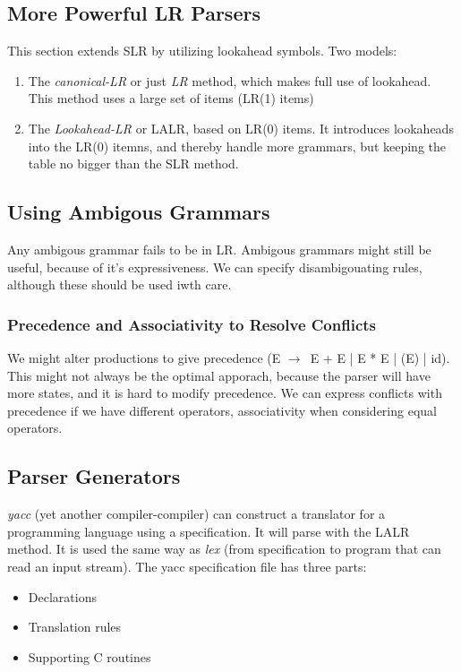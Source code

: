 \documentclass{article}
\newcommand{\ta}{$\to$~}
\begin{document}

\subsection{More Powerful LR Parsers} %
\label{sub:More Powerful LR Parsers}
This section extends SLR by utilizing lookahead symbols. Two models:
\begin{enumerate}
	\item The \emph{canonical-LR} or just \emph{LR} method, which makes full use of lookahead. This method uses a large set of items (LR(1) items)
	\item The \emph{Lookahead-LR} or LALR, based on LR(0) items. It introduces lookaheads into the LR(0) itemns, and thereby handle more grammars, but keeping the table no bigger than the SLR method.
\end{enumerate}

\subsection{Using Ambigous Grammars} %
\label{sub:Using Ambigous Grammars}
Any ambigous grammar fails to be in LR. Ambigous grammars might still be useful, because of it's expressiveness. We can specify disambigouating rules, although these should be used iwth care.

\subsubsection{Precedence and Associativity to Resolve Conflicts} %
\label{ssub:Precedence an dAssociativity to Resolve Conflicts}
We might alter productions to give precedence (E \ta E + E | E * E | (E) | id). This might not always be the optimal apporach, because the parser will have more states, and it is hard to modify precedence. We can express conflicts with precedence if we have different operators, associativity when considering equal operators.

\subsection{Parser Generators} %
\label{sub:Parser Generators}
\emph{yacc} (yet another compiler-compiler) can construct a translator for a programming language using a specification. It will parse with the LALR method. It is used the same way as \emph{lex} (from specification to program that can read an input stream). The yacc specification file has three parts:
\begin{itemize}
	\item Declarations
	\item Translation rules
	\item Supporting C routines
\end{itemize}
\end{document}
